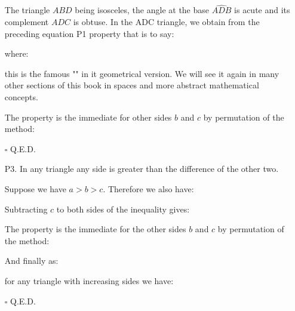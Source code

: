\begin{enumerate}
\begin{dem}
		The triangle $ABD$ being isosceles, the angle at the base $\widehat{ADB}$ is acute and its complement $\widehat{ADC}$ is obtuse. In the ADC triangle, we obtain from the preceding equation P1 property that is to say:
		
		where:
		
		this is the famous "" in it geometrical version. We will see it again in many other sections of this book in spaces and more abstract mathematical concepts.
	
		The property is the immediate for other sides $b$ and $c$ by permutation of the method:
		
		\begin{flushright}
			$\square$  Q.E.D.
		\end{flushright}
		\end{dem}


		\item[P3.] In any triangle any side is greater than the difference of the other two.
		\begin{dem}
		Suppose we have $a>b>c$. Therefore we also have:
		
		Subtracting $c$ to both sides of the inequality gives:
		
		The property is the immediate for the other sides $b$ and $c$ by permutation of the method:
		
		And finally as:
		
		for any triangle with increasing sides we have:
		
		\begin{flushright}
			$\square$  Q.E.D.
		\end{flushright}
		\end{dem}
	\end{enumerate}
	
